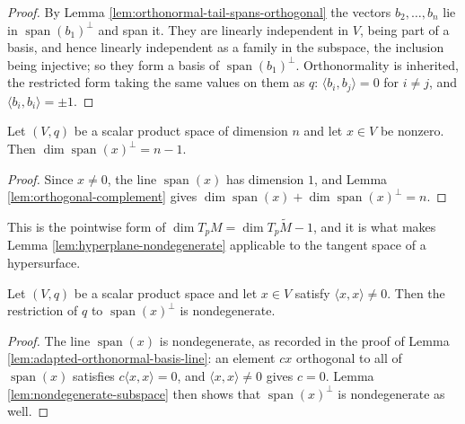 \begin{proof}
\leanok
{}
By Lemma \ref{lem:orthonormal-tail-spans-orthogonal} the vectors $b_2,\ldots,b_n$ lie in $\operatorname{span}(b_1)^\perp$ and span it. They are linearly independent in $V$, being part of a basis, and hence linearly independent as a family in the subspace, the inclusion being injective; so they form a basis of $\operatorname{span}(b_1)^\perp$. Orthonormality is inherited, the restricted form taking the same values on them as $q$: $\langle b_i,b_j\rangle = 0$ for $i \neq j$, and $\langle b_i,b_i\rangle = \pm 1$.
\end{proof}

\begin{lemma}
\label{lem:orthogonal-complement-non-null-line-hyperplane}
\leanok
{}
Let $(V,q)$ be a scalar product space of dimension $n$ and let $x \in V$ be nonzero. Then $\dim \operatorname{span}(x)^\perp = n - 1$.
\end{lemma}

\begin{proof}
\leanok
{}
Since $x \neq 0$, the line $\operatorname{span}(x)$ has dimension $1$, and Lemma \ref{lem:orthogonal-complement} gives $\dim \operatorname{span}(x) + \dim \operatorname{span}(x)^\perp = n$.
\end{proof}

This is the pointwise form of $\dim T_pM = \dim T_p\tilde M - 1$, and it is what makes Lemma \ref{lem:hyperplane-nondegenerate} applicable to the tangent space of a hypersurface.

\begin{lemma}
\label{lem:orthogonal-complement-non-null-line-nondegenerate}
\leanok
{}
Let $(V,q)$ be a scalar product space and let $x \in V$ satisfy $\langle x,x\rangle \neq 0$. Then the restriction of $q$ to $\operatorname{span}(x)^\perp$ is nondegenerate.
\end{lemma}

\begin{proof}
\leanok
{}
The line $\operatorname{span}(x)$ is nondegenerate, as recorded in the proof of Lemma \ref{lem:adapted-orthonormal-basis-line}: an element $cx$ orthogonal to all of $\operatorname{span}(x)$ satisfies $c\langle x,x\rangle = 0$, and $\langle x,x \rangle \neq 0$ gives $c = 0$. Lemma \ref{lem:nondegenerate-subspace} then shows that $\operatorname{span}(x)^\perp$ is nondegenerate as well.
\end{proof}

